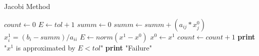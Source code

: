 \documentclass{article}
\begin{document}
  \begin{algorithm}
    \caption{Jacobi Method}
    \begin{algorithmic}[1]
        \State $count \gets 0$
        \State $E \gets tol + 1$
            \State $summ \gets 0$
                \State $summ \gets summ + (a_{ij} * x_{j}^{0})$
              \EndIf
            \EndFor
            \State $x_{i}^{1} = (b_{i} - summ) / a_{ii}$
          \EndFor
          \State $E \gets norm(x^{1} - x^{0})$
          \State $x^{0} \gets x^{1}$
          \State $count \gets count + 1$
        \EndWhile
          \State \textbf{print} "$x^{1}$ is approximated by $E < tol$"
        \Else
            \State \textbf{print} "Failure"
        \EndIf
      \EndProcedure
    \end{algorithmic}
  \end{algorithm}
\end{document}
